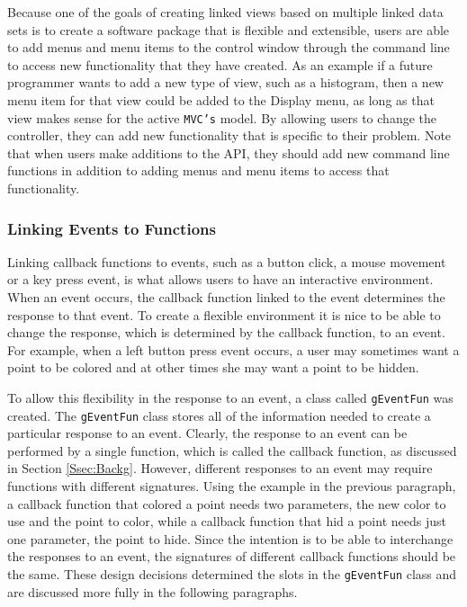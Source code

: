\documentclass{article}[11pt]
\newcommand{\Robject}[1]{{\texttt{#1}}}
\newcommand{\Rclass}[1]{\texttt{#1}}
\begin{document}
Because one of the goals of creating linked views based on multiple linked
data sets is to create a software package that is flexible and extensible,
users are able to add menus and menu items to the control window through
the command line to access new functionality that they have created.  As an
example if a future programmer wants to add a new type of view, such as a
histogram, then a new menu item for that view could be added to the Display
menu, as long as that view makes sense for the active \Robject{MVC's} model.
By allowing users to change the controller, they can add new functionality that
is specific to their problem.  Note that when users make additions to the API,
they should add new command line functions in addition to adding menus and
menu items to access that functionality.

\subsubsection{Linking Events to Functions}\label{Ssec:OneEvent}

Linking callback functions to events, such as a button click, a mouse movement
or a key press event, is what allows users to have an interactive
environment.  When an event occurs, the callback function linked to the event
determines the response to that event.  To create a flexible environment
it is nice to be able to change the response, which is determined by the
callback function, to an event.  For example, when a left button press event
occurs, a user may sometimes want a point to be colored and at other times she
may want a point to be hidden.  

To allow this flexibility in the response to an event, a class called
\Rclass{gEventFun} was created.  The \Rclass{gEventFun} class stores all of
the information needed to create a particular response to an event.
Clearly, the response to an event can be performed by a single function,
which is called the callback function, as discussed in Section
\ref{Ssec:Backg}.  However, different responses to an event may require
functions with different signatures.  Using the example in the previous
paragraph, a callback function that colored a point needs two parameters,
the new color to use and the point to color, while a callback function that
hid a point needs just one parameter, the point to hide.  Since the
intention is to be able to interchange the responses to an event, the
signatures of different callback functions should be the same.  These design
decisions determined the slots in the \Rclass{gEventFun} class and are
discussed more fully in the following paragraphs. 
\end{document}
